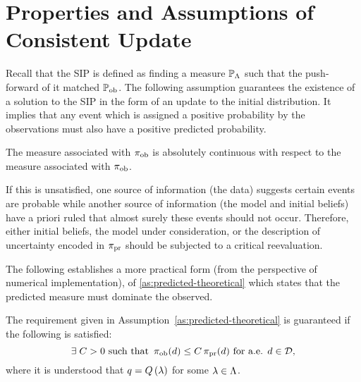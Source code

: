 \section{Properties and Assumptions of Consistent Update}\label{sec:properties}
Recall that the SIP is defined as finding a measure $\mathbb{P}_{\Lambda}$ such that the push-forward of it matched $\operatorname*{\mathbb{P}_{ob}}$.
The following assumption guarantees the existence of a solution to the SIP in the form of an update to the initial distribution.
It implies that any event which is assigned a positive probability by the observations must also have a positive predicted probability.

\begin{assumption}\label{as:predicted-theoretical}
  The measure associated with $\operatorname*{\pi_{ob}}$ is absolutely continuous with respect to the measure associated with $\operatorname*{\pi_{ob}}$.
\end{assumption}

If this is unsatisfied, one source of information (the data) suggests certain events are probable while another source of information (the model and initial beliefs) have a priori ruled that almost surely these events should not occur.
Therefore, either initial beliefs, the model under consideration, or the description of uncertainty encoded in $\operatorname*{\pi_{pr}}$ should be subjected to a critical reevaluation.

The following establishes a more practical form (from the perspective of numerical implementation), of \ref{as:predicted-theoretical} which states that the predicted measure must dominate the observed.
\begin{assumption}\label{as:predicted-practical}
The requirement given in Assumption~\ref{as:predicted-theoretical} is guaranteed if the following is satisfied:
\begin{equation}\label{eq:pred-pract}
  \exists \; C>0 \text{ such that } \operatorname*{\pi_{ob}} (d) \leq C \operatorname*{\pi_{pr}}(d) \text{ for a.e. } d\in \mathcal{D},
\end{equation}
where it is understood that $q = Q\left ( \lambda \right )$ for some $\lambda \in {\Lambda}$.
\end{assumption}

